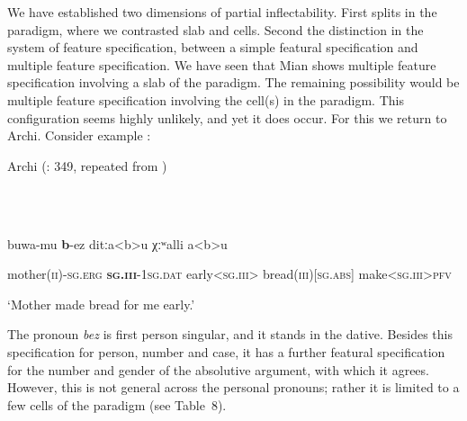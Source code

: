\documentclass[output=paper]{langscibook}
\begin{document}
We have established two dimensions of partial inflectability. First splits in the paradigm, where we contrasted slab and cells. Second the distinction in the system of feature specification, between a simple featural specification and multiple feature specification. We have seen that Mian shows multiple feature specification involving a slab of the paradigm. The remaining possibility would be multiple feature specification involving the cell(s) in the paradigm. This configuration seems highly unlikely, and yet it does occur. For this we return to Archi. Consider example : 

Archi (\citealt{Kibrik1994}: 349, repeated from )

\ea%
    \label{ex:key:12}
    \gll \\
         \\
    \glt
    \z %

          buwa-mu  \textbf{b}{}-ez  ditːa<b>u  χːʷalli  a<b>u

  mother(\textsc{ii})-\textsc{sg.erg}  \textbf{\textsc{sg.iii}}{}-1\textsc{sg}.\textsc{dat}  early<\textsc{sg.iii}>  bread(\textsc{iii)[sg.abs]}  make<\textsc{sg.iii}>\textsc{pfv}

  ‘Mother made bread for me early.’

The pronoun \textit{bez} is first person singular, and it stands in the dative. Besides this specification for person, number and case, it has a further featural specification for the number and gender of the absolutive argument, with which it agrees. However, this is not general across the personal pronouns; rather it is limited to a few cells of the paradigm (see Table~8).
\end{document}

